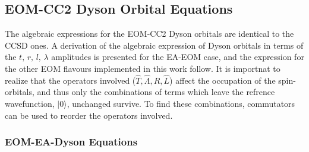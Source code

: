 \subsection{EOM-CC2 Dyson Orbital Equations\label{sec:theory_dyson}}

The algebraic expressions for the EOM-CC2 Dyson orbitals are identical to the CCSD ones. A derivation of the algebraic expression of Dyson orbitals in terms of the $t,\, r,\, l,\, \lambda$ amplitudes is presented for the EA-EOM case, and the expression for the other EOM flavours implemented in this work follow.
It is importnat to realize that the operators involved ($\hat{T},\hat{\Lambda},\hat{R},\hat{L}$) affect the occupation of the spin-orbitals, and thus only the combinations of terms which leave the refrence wavefunction, $| 0 \rangle$, unchanged survive. To find these combinations, commutators can be used to reorder the operators involved.

\subsubsection{EOM-EA-Dyson Equations}

